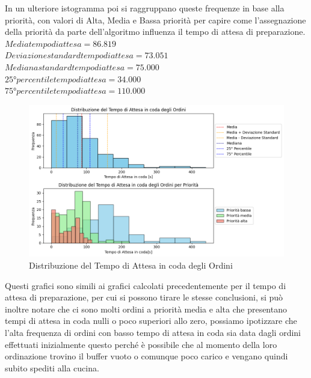 In un ulteriore istogramma poi si raggruppano queste frequenze in base alla priorità, con valori di Alta, Media e Bassa priorità per capire come l'assegnazione della priorità da parte dell'algoritmo influenza il tempo di attesa di preparazione.\\
$Media tempo di attesa = 86.819$\\
$Deviazione standard tempo di attesa = 73.051$\\
$Mediana standard tempo di attesa = 75.000$\\
$25° percentile tempo di attesa = 34.000$\\
$75° percentile tempo di attesa = 110.000$
\begin{figure}[H]
	\centering
	\includegraphics[scale=0.6]{iterazione3/images/distr_t_attesa_coda.png}
	\caption{Distribuzione del Tempo di Attesa in coda degli Ordini\label{fig:distr_t_attesa_coda}}
\end{figure}
Questi grafici sono simili ai grafici calcolati precedentemente per il tempo di attesa di preparazione, per cui si possono tirare le stesse conclusioni, si può inoltre notare che ci sono molti ordini a priorità media e alta che presentano tempi di attesa in coda nulli o poco superiori allo zero, possiamo ipotizzare che l'alta frequenza di ordini con basso tempo di attesa in coda sia data dagli ordini effettuati inizialmente questo perché è possibile che al momento della loro ordinazione trovino il buffer vuoto o comunque poco carico e vengano quindi subito spediti alla cucina.
